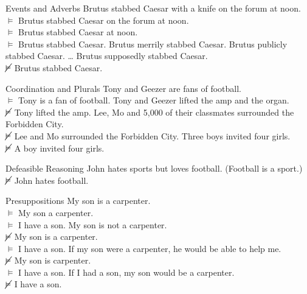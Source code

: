 \documentclass{beamer}
\begin{document}
\begin{frame}{Events and Adverbs}
Brutus stabbed Caesar with a knife on the forum at noon. \\
\pause
$\vDash$ Brutus stabbed Caesar on the forum at noon. \\
\pause
$\vDash$ Brutus stabbed Caesar at noon. \\
\pause
$\vDash$ Brutus stabbed Caesar.
\vfill
\pause
Brutus merrily stabbed Caesar. \pause Brutus publicly stabbed Caesar. \ldots
\vfill
\pause
Brutus supposedly stabbed Caesar. \\
$\cancel{\vDash}$ Brutus stabbed Caesar.
\end{frame}


\begin{frame}{Coordination and Plurals}
Tony and Geezer are fans of football.\\
$\vDash$ Tony is a fan of football.
\vfill
\pause
Tony and Geezer lifted the amp and the organ.\\
$\cancel{\vDash}$ Tony lifted the amp.
\vfill
\pause
Lee, Mo and 5,000 of their classmates surrounded the Forbidden City.\\
$\cancel{\vDash}$ Lee and Mo surrounded the Forbidden City.
\vfill
\pause
Three boys invited four girls.\\
$\cancel{\vDash}$ A boy invited four girls.
\end{frame}


\begin{frame}{Defeasible Reasoning}
John hates sports but loves football. (Football is a sport.) \\
$\cancel{\vDash}$ John hates football.
\end{frame}


\begin{frame}{Presuppositions}
My son is a carpenter. \\
$\vDash$ My son a carpenter. \\
$\vDash$ I have a son.
\vfill
\pause
My son is not a carpenter. \\
$\cancel{\vDash}$ My son is a carpenter. \\
$\vDash$ I have a son.
\vfill
\pause
If my son were a carpenter, he would be able to help me. \\
$\cancel{\vDash}$ My son is carpenter. \\
$\vDash$ I have a son.
\vfill
\pause
If I had a son, my son would be a carpenter. \\
$\cancel{\vDash}$ I have a son.
\end{frame}
\end{document}

